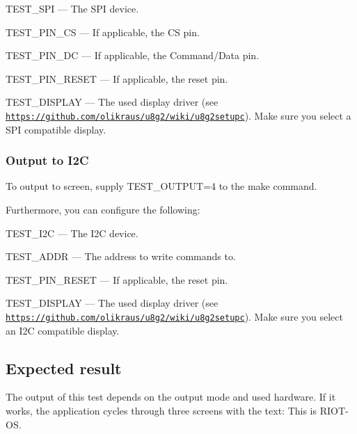 \begin{DoxyItemize}
\item {\ttfamily T\+E\+S\+T\+\_\+\+S\+PI} --- The S\+PI device.
\item {\ttfamily T\+E\+S\+T\+\_\+\+P\+I\+N\+\_\+\+CS} --- If applicable, the CS pin.
\item {\ttfamily T\+E\+S\+T\+\_\+\+P\+I\+N\+\_\+\+DC} --- If applicable, the Command/\+Data pin.
\item {\ttfamily T\+E\+S\+T\+\_\+\+P\+I\+N\+\_\+\+R\+E\+S\+ET} --- If applicable, the reset pin.
\item {\ttfamily T\+E\+S\+T\+\_\+\+D\+I\+S\+P\+L\+AY} --- The used display driver (see \href{https://github.com/olikraus/u8g2/wiki/u8g2setupc}{\tt https\+://github.\+com/olikraus/u8g2/wiki/u8g2setupc}). Make sure you select a S\+PI compatible display.
\end{DoxyItemize}

\subsubsection*{Output to I2C}

To output to screen, supply {\ttfamily T\+E\+S\+T\+\_\+\+O\+U\+T\+P\+UT=4} to the {\ttfamily make} command.

Furthermore, you can configure the following\+:


\begin{DoxyItemize}
\item {\ttfamily T\+E\+S\+T\+\_\+\+I2C} --- The I2C device.
\item {\ttfamily T\+E\+S\+T\+\_\+\+A\+D\+DR} --- The address to write commands to.
\item {\ttfamily T\+E\+S\+T\+\_\+\+P\+I\+N\+\_\+\+R\+E\+S\+ET} --- If applicable, the reset pin.
\item {\ttfamily T\+E\+S\+T\+\_\+\+D\+I\+S\+P\+L\+AY} --- The used display driver (see \href{https://github.com/olikraus/u8g2/wiki/u8g2setupc}{\tt https\+://github.\+com/olikraus/u8g2/wiki/u8g2setupc}). Make sure you select an I2C compatible display.
\end{DoxyItemize}

\subsection*{Expected result}

The output of this test depends on the output mode and used hardware. If it works, the application cycles through three screens with the text\+: \textquotesingle{}This is R\+I\+O\+T-\/\+OS\textquotesingle{}. 